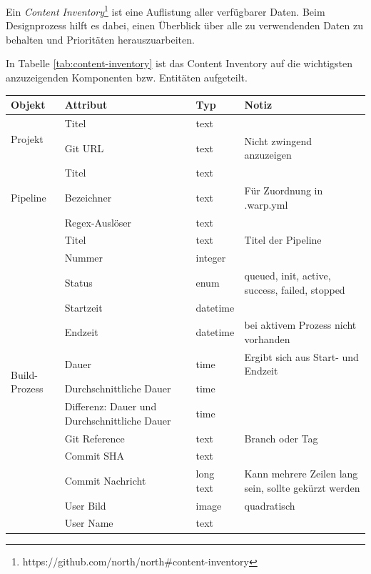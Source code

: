 Ein \emph{Content Inventory}\footnote{https://github.com/north/north\#content-inventory} ist eine Auflistung aller verfügbarer Daten. Beim Designprozess hilft es dabei, einen Überblick über alle zu verwendenden Daten zu behalten und Prioritäten herauszuarbeiten.

In Tabelle \ref{tab:content-inventory} ist das Content Inventory auf die wichtigsten anzuzeigenden Komponenten bzw. Entitäten aufgeteilt.

\begin{table}[H]
  \scriptsize
  \begin{tabularx}{\textwidth}{| l | p{3cm} | l | X |}
    \hline
    \textbf{Objekt} & \textbf{Attribut} & \textbf{Typ} & \textbf{Notiz} \\ \hline
    \multirow{2}{*}{Projekt} & Titel & text &  \\ \cline{2-4}
      & Git URL & text & Nicht zwingend anzuzeigen \\ \hline
    \multirow{3}{*}{Pipeline} & Titel & text &  \\ \cline{2-4}
      & Bezeichner & text & Für Zuordnung in .warp.yml \\ \cline{2-4}
      & Regex-Auslöser & text &   \\ \hline
    \multirow{13}{*}{Build-Prozess} & Titel & text & Titel der Pipeline \\ \cline{2-4}
      & Nummer & integer &  \\ \cline{2-4}
      & Status & enum & queued, init, active, success, failed, stopped \\ \cline{2-4}
      & Startzeit & datetime &  \\ \cline{2-4}
      & Endzeit & datetime & bei aktivem Prozess nicht vorhanden \\ \cline{2-4}
      & Dauer & time & Ergibt sich aus Start- und Endzeit \\ \cline{2-4}
      & Durchschnittliche Dauer & time &  \\ \cline{2-4}
      & Differenz: Dauer und Durchschnittliche Dauer & time &  \\ \cline{2-4}
      & Git Reference & text & Branch oder Tag \\ \cline{2-4}
      & Commit SHA & text &  \\ \cline{2-4}
      & Commit Nachricht & long text & Kann mehrere Zeilen lang sein, sollte gekürzt werden \\ \cline{2-4}
      & User Bild & image & quadratisch \\ \cline{2-4}
      & User Name & text &  \\ \hline

\end{tabularx}
\end{table}
